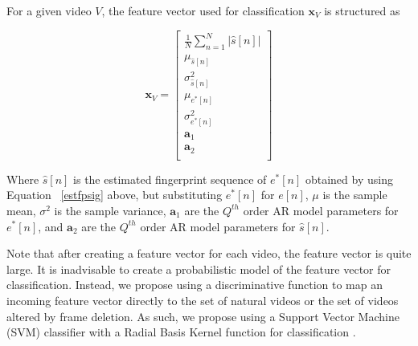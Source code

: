 For a given video $V$, the feature vector used for classification $\bm{x}_{V}$ is structured as

\begin{equation}
  \bm{x}_{V} = \begin{bmatrix}
    \frac{1}{N} \sum_{n=1}^{N} \vert \hat{s}[n] \vert \\
    \mu_{\hat{s}[n]} \\
    \sigma_{\hat{s}[n]}^{2} \\
    \mu_{e^{*}[n]} \\
    \sigma_{e^{*}[n]}^{2} \\
    \bm{a}_{1} \\
    \bm{a}_{2} \\
  \end{bmatrix}
\end{equation}

Where $\hat{s}[n]$ is the estimated fingerprint sequence of $e^{*}[n]$ obtained by using Equation ~\ref{estfpsig} above, but substituting $e^{*}[n]$ for $e[n]$, $\mu$ is the sample mean, $\sigma^{2}$ is the sample variance, $\bm{a}_{1}$ are the $Q^{th}$ order AR model parameters for $e^{*}[n]$, and $\bm{a}_{2}$ are the $Q^{th}$ order AR model parameters for $\hat{s}[n]$.

Note that after creating a feature vector for each video, the feature vector is quite large. It is inadvisable to create a probabilistic model of the feature vector for classification. Instead, we propose using a discriminative function to map an incoming feature vector directly to the set of natural videos or the set of videos altered by frame deletion. As such, we propose using a Support Vector Machine (SVM) classifier with a Radial Basis Kernel function for classification \cite{svm}.